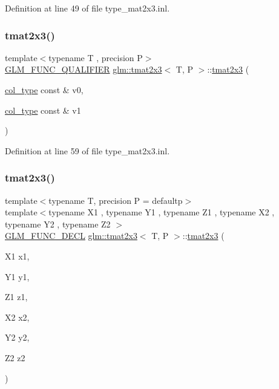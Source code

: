 Definition at line 49 of file type\+\_\+mat2x3.\+inl.

\mbox{\label{structglm_1_1tmat2x3_a4321710182d684f5fd821657c2c950ec}} 
\subsubsection{\texorpdfstring{tmat2x3()}{tmat2x3()}\hspace{0.1cm}{\footnotesize\ttfamily [7/22]}}
{\footnotesize\ttfamily template$<$typename T , precision P$>$ \\
\mbox{\hyperlink{setup_8hpp_a33fdea6f91c5f834105f7415e2a64407}{G\+L\+M\+\_\+\+F\+U\+N\+C\+\_\+\+Q\+U\+A\+L\+I\+F\+I\+ER}} \mbox{\hyperlink{structglm_1_1tmat2x3}{glm\+::tmat2x3}}$<$ T, P $>$\+::\mbox{\hyperlink{structglm_1_1tmat2x3}{tmat2x3}} (\begin{DoxyParamCaption}\item[{\mbox{\hyperlink{structglm_1_1tmat2x3_a62523fc3d245c37e15d68c3b9729f366}{col\+\_\+type}} const \&}]{v0,  }\item[{\mbox{\hyperlink{structglm_1_1tmat2x3_a62523fc3d245c37e15d68c3b9729f366}{col\+\_\+type}} const \&}]{v1 }\end{DoxyParamCaption})}



Definition at line 59 of file type\+\_\+mat2x3.\+inl.

\mbox{\label{structglm_1_1tmat2x3_ac677b215b77c91b891d953c3a22e599e}} 
\subsubsection{\texorpdfstring{tmat2x3()}{tmat2x3()}\hspace{0.1cm}{\footnotesize\ttfamily [8/22]}}
{\footnotesize\ttfamily template$<$typename T, precision P = defaultp$>$ \\
template$<$typename X1 , typename Y1 , typename Z1 , typename X2 , typename Y2 , typename Z2 $>$ \\
\mbox{\hyperlink{setup_8hpp_ab2d052de21a70539923e9bcbf6e83a51}{G\+L\+M\+\_\+\+F\+U\+N\+C\+\_\+\+D\+E\+CL}} \mbox{\hyperlink{structglm_1_1tmat2x3}{glm\+::tmat2x3}}$<$ T, P $>$\+::\mbox{\hyperlink{structglm_1_1tmat2x3}{tmat2x3}} (\begin{DoxyParamCaption}\item[{X1}]{x1,  }\item[{Y1}]{y1,  }\item[{Z1}]{z1,  }\item[{X2}]{x2,  }\item[{Y2}]{y2,  }\item[{Z2}]{z2 }\end{DoxyParamCaption})}

